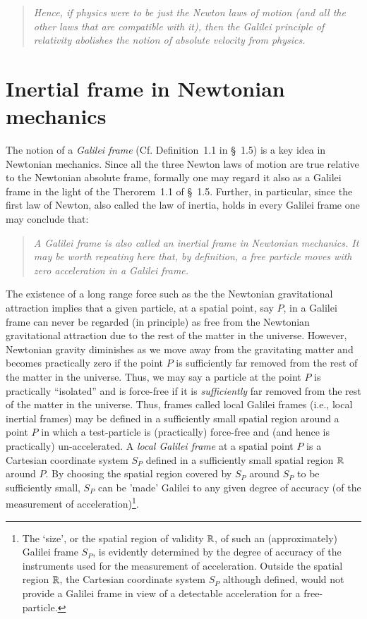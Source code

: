 \begin{quote}
\textsl{Hence, if physics were to be just the Newton 
laws of motion (and all the other laws that are compatible 
with it), then the Galilei principle of relativity abolishes 
the notion of absolute velocity from physics.}
\end{quote}

\section{Inertial frame in Newtonian mechanics} 
The notion of a \textsl{Galilei frame} (Cf. Definition~1.1 
in \S~1.5) is a  key idea in Newtonian mechanics. Since  all 
the three Newton laws of motion are true relative to the 
Newtonian absolute frame, formally one may regard it also as 
a Galilei frame in the light of the Therorem~1.1 of  \S~1.5. 
Further, in particular, since the first law of Newton, 
also called the law of inertia, holds in every Galilei 
frame one may conclude that:
\begin{quote}
\textsl{A Galilei frame is also called an inertial  frame 
in Newtonian mechanics. It may be worth repeating here 
that, by definition, a \textsl{free particle} moves with 
zero acceleration in a Galilei frame.} 
\end{quote}

The existence of a long range force such as the the 
Newtonian gravitational attraction implies that a given 
particle, at a spatial point, say $P$, in a Galilei frame 
can never be regarded (in principle) as free from the 
Newtonian gravitational attraction due to the rest of the 
matter in the universe. However, Newtonian gravity 
diminishes as we move away from the gravitating matter 
and becomes practically zero if the point $P$ is 
sufficiently far removed from the rest of the matter in 
the universe. Thus, we may say a particle at the point 
$P$ is practically ``isolated'' and is force-free if it 
is \textsl{sufficiently} far removed from the rest of 
the matter in the universe. Thus, frames called local 
Galilei frames (i.e., local inertial frames) may be 
defined in a sufficiently small spatial region around 
a point $P$ in which a test-particle is (practically) 
force-free and (and hence is practically) 
un-accelerated.
\dfn A \textsl{local Galilei frame} at a spatial point 
$P$ is a Cartesian coordinate system $S_P$ defined in 
a sufficiently small spatial region $\mathbb{R}$ around 
$P$. By choosing the spatial region covered by  $S_P$ 
around $S_P$ to be sufficiently small,  $S_P$ can be 
'made' Galilei to any  given  degree of accuracy (of 
the measurement of acceleration)\footnote{ The `size', 
or the spatial region of validity $\mathbb{R}$, of such 
an (approximately) Galilei frame $S_P$, is evidently 
determined by the degree of accuracy of the instruments 
used for the measurement of acceleration. Outside the 
spatial region $\mathbb{R}$, the Cartesian coordinate 
system $S_P$ although defined, would not provide a 
Galilei frame in view of a detectable acceleration for 
a free-particle.}.

